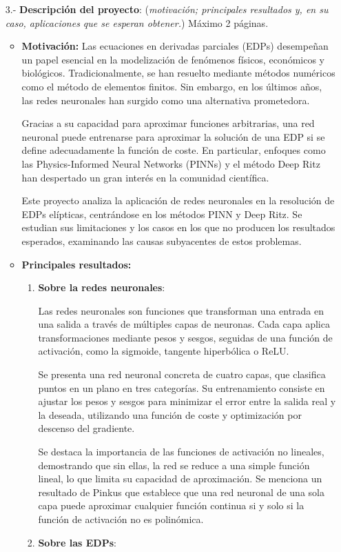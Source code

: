 \documentclass{article}
\begin{document}
\begin{enumerate}
\begin{enumerate}
\end{enumerate}

\item[3.-] {\bf Descripci\'on del proyecto}: (\textit{motivaci\'on; principales resultados y, en su caso, aplicaciones que se esperan obtener.}) M\'aximo 2 p\'aginas.

\begin{itemize}
    \item \textbf{Motivación:} Las ecuaciones en derivadas parciales (EDPs) desempeñan un papel esencial en la modelización de fenómenos físicos, económicos y biológicos. Tradicionalmente, se han resuelto mediante métodos numéricos como el método de elementos finitos. Sin embargo, en los últimos años, las redes neuronales han surgido como una alternativa prometedora.

    Gracias a su capacidad para aproximar funciones arbitrarias, una red neuronal puede entrenarse para aproximar la solución de una EDP si se define adecuadamente la función de coste. En particular, enfoques como las Physics-Informed Neural Networks (PINNs) y el método Deep Ritz han despertado un gran interés en la comunidad científica.
    
    Este proyecto analiza la aplicación de redes neuronales en la resolución de EDPs elípticas, centrándose en los métodos PINN y Deep Ritz. Se estudian sus limitaciones y los casos en los que no producen los resultados esperados, examinando las causas subyacentes de estos problemas.
    
    \item \textbf{Principales resultados:}
    \begin{enumerate}
        \item \textbf{Sobre la redes neuronales}:
        
        Las redes neuronales son funciones que transforman una entrada en una salida a través de múltiples capas de neuronas. Cada capa aplica transformaciones mediante pesos y sesgos, seguidas de una función de activación, como la sigmoide, tangente hiperbólica o ReLU.

        Se presenta una red neuronal concreta de cuatro capas, que clasifica puntos en un plano en tres categorías. Su entrenamiento consiste en ajustar los pesos y sesgos para minimizar el error entre la salida real y la deseada, utilizando una función de coste y optimización por descenso del gradiente.
        
        Se destaca la importancia de las funciones de activación no lineales, demostrando que sin ellas, la red se reduce a una simple función lineal, lo que limita su capacidad de aproximación. Se menciona un resultado de Pinkus que establece que una red neuronal de una sola capa puede aproximar cualquier función continua si y solo si la función de activación no es polinómica.
        \item \textbf{Sobre las EDPs}:


\end{enumerate}
\end{itemize}
\end{enumerate}
\end{document}
